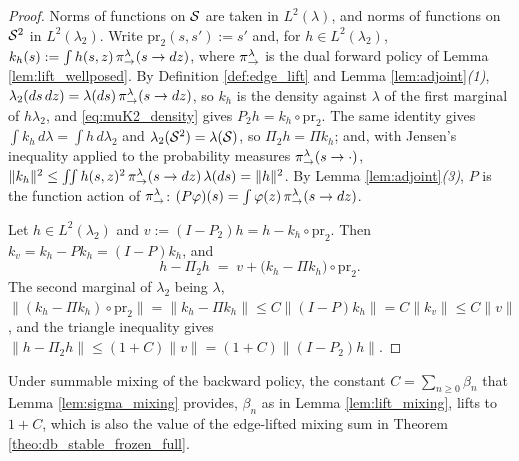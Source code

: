 \begin{proof}
Norms of functions on $\mathcal S$ are taken in $L^2(\lambda)$, and norms of functions on $\mathcal S^2$ in $L^2(\lambda_2)$. Write $\mathrm{pr}_2(s,s'):=s'$ and, for $h\in L^2(\lambda_2)$, $k_h(s):=\int h(s,z)\,\pi_{\rightarrow}^\lambda(s\rightarrow dz)$, where $\pi_{\rightarrow}^\lambda$ is the dual forward policy of Lemma \ref{lem:lift_wellposed}. By Definition \ref{def:edge_lift} and Lemma \ref{lem:adjoint}\emph{(1)}, $\lambda_2(ds\,dz)=\lambda(ds)\,\pi_{\rightarrow}^\lambda(s\rightarrow dz)$, so $k_h$ is the density against $\lambda$ of the first marginal of $h\lambda_2$, and \eqref{eq:muK2_density} gives $P_2h=k_h\circ\mathrm{pr}_2$. The same identity gives $\int k_h\,d\lambda=\int h\,d\lambda_2$ and $\lambda_2(\mathcal S^2)=\lambda(\mathcal S)$, so $\Pi_2h=\Pi k_h$; and, with Jensen's inequality applied to the probability measures $\pi_{\rightarrow}^\lambda(s\rightarrow\cdot)$, $\|k_h\|^2\leq\iint h(s,z)^2\,\pi_{\rightarrow}^\lambda(s\rightarrow dz)\,\lambda(ds)=\|h\|^2$. By Lemma \ref{lem:adjoint}\emph{(3)}, $P$ is the function action of $\pi_{\rightarrow}^\lambda$: $(P\varphi)(s)=\int\varphi(z)\,\pi_{\rightarrow}^\lambda(s\rightarrow dz)$.

Let $h\in L^2(\lambda_2)$ and $v:=(I-P_2)h=h-k_h\circ\mathrm{pr}_2$. Then $k_v=k_h-Pk_h=(I-P)k_h$, and
\begin{equation*}
    h-\Pi_2h\;=\;v+\bigl(k_h-\Pi k_h\bigr)\circ\mathrm{pr}_2 .
\end{equation*}
The second marginal of $\lambda_2$ being $\lambda$, $\|(k_h-\Pi k_h)\circ\mathrm{pr}_2\|=\|k_h-\Pi k_h\|\leq C\|(I-P)k_h\|=C\|k_v\|\leq C\|v\|$, and the triangle inequality gives $\|h-\Pi_2h\|\leq(1+C)\|v\|=(1+C)\|(I-P_2)h\|$.
\end{proof}

Under summable mixing of the backward policy, the constant $C=\sum_{n\geq0}\beta_n$ that Lemma \ref{lem:sigma_mixing} provides, $\beta_n$ as in Lemma \ref{lem:lift_mixing}, lifts to $1+C$, which is also the value of the edge-lifted mixing sum in Theorem \ref{theo:db_stable_frozen_full}.

